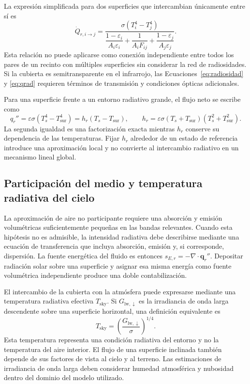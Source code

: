 La expresión simplificada para dos superficies que intercambian únicamente entre sí es
\begin{equation}
\dot Q_{r,i\rightarrow j}=
\frac{\sigma(T_i^4-T_j^4)}
{\dfrac{1-\varepsilon_i}{A_i\varepsilon_i}
+\dfrac{1}{A_iF_{ij}}
+\dfrac{1-\varepsilon_j}{A_j\varepsilon_j}}.
\label{eq:qrad}
\end{equation}
Esta relación no puede aplicarse como conexión independiente entre todos los pares de un recinto con múltiples superficies sin considerar la red de radiosidades. Si la cubierta es semitransparente en el infrarrojo, las Ecuaciones~\eqref{eq:radiosidad} y \eqref{eq:qrad} requieren términos de transmisión y condiciones ópticas adicionales.

Para una superficie frente a un entorno radiativo grande, el flujo neto se escribe como
\begin{equation}
q_r''=\varepsilon\sigma(T_s^4-T_{\mathrm{sur}}^4)
=h_r(T_s-T_{\mathrm{sur}}),
\qquad
h_r=\varepsilon\sigma(T_s+T_{\mathrm{sur}})(T_s^2+T_{\mathrm{sur}}^2).
\label{eq:hr}
\end{equation}
La segunda igualdad es una factorización exacta mientras $h_r$ conserve su dependencia de las temperaturas. Fijar $h_r$ alrededor de un estado de referencia introduce una aproximación local y no convierte al intercambio radiativo en un mecanismo lineal global.

\subsection{Participación del medio y temperatura radiativa del cielo}

La aproximación de aire no participante requiere una absorción y emisión volumétricas suficientemente pequeñas en las bandas relevantes. Cuando esta hipótesis no es admisible, la intensidad radiativa debe describirse mediante una ecuación de transferencia que incluya absorción, emisión y, si corresponde, dispersión. La fuente energética del fluido es entonces $s_{E,r}=-\nabla\cdot\mathbf q_r''$. Depositar radiación solar sobre una superficie y asignar esa misma energía como fuente volumétrica independiente produce una doble contabilización.

El intercambio de la cubierta con la atmósfera puede expresarse mediante una temperatura radiativa efectiva $T_{\mathrm{sky}}$. Si $G_{\mathrm{lw},\downarrow}$ es la irradiancia de onda larga descendente sobre una superficie horizontal, una definición equivalente es
\begin{equation}
T_{\mathrm{sky}}=
\left(\frac{G_{\mathrm{lw},\downarrow}}{\sigma}\right)^{1/4}.
\label{eq:temperatura_cielo}
\end{equation}
Esta temperatura representa una condición radiativa del entorno y no la temperatura del aire interior. El flujo de una superficie inclinada también depende de sus factores de vista al cielo y al terreno. Las estimaciones de irradiancia de onda larga deben considerar humedad atmosférica y nubosidad dentro del dominio del modelo utilizado.


